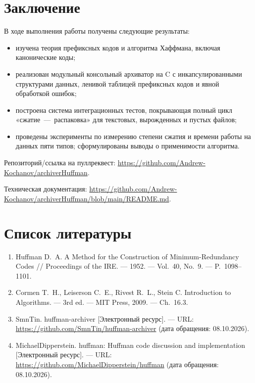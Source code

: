 \documentclass[a4paper]{article}
\begin{document}
\section{Заключение}

В ходе выполнения работы получены следующие результаты:

\begin{itemize}
    \item изучена теория префиксных кодов и алгоритма Хаффмана,
    включая канонические коды;
    \item реализован модульный консольный архиватор на C
    с инкапсулированными структурами данных, ленивой таблицей
    префиксных кодов и явной обработкой ошибок;
    \item построена система интеграционных тестов, покрывающая
    полный цикл «сжатие~---~распаковка» для текстовых,
    вырожденных и пустых файлов;
    \item проведены эксперименты по измерению степени сжатия
    и времени работы на данных пяти типов; сформулированы
    выводы о применимости алгоритма.
\end{itemize}

Репозиторий/ссылка на пуллреквест: \url{https://github.com/Andrew-Kochanov/archiverHuffman}.

Техническая документация: \url{https://github.com/Andrew-Kochanov/archiverHuffman/blob/main/README.md}.

\section*{Список литературы}

\begin{enumerate}
    \item Huffman D.~A. A Method for the Construction of Minimum-Redundancy
    Codes // Proceedings of the IRE. — 1952. — Vol.~40, No.~9. — P.~1098--1101.

    \item Cormen T.~H., Leiserson C.~E., Rivest R.~L., Stein C.
    Introduction to Algorithms. --- 3rd ed. --- MIT Press, 2009. --- Ch.~16.3.

    \item SmnTin. huffman-archiver [Электронный ресурс]. — URL:
    \url{https://github.com/SmnTin/huffman-archiver}
    (дата обращения: 08.10.2026).

    \item MichaelDipperstein. huffman: Huffman code discussion and
    implementation [Электронный ресурс]. — URL:
    \url{https://github.com/MichaelDipperstein/huffman}
    (дата обращения: 08.10.2026).
\end{enumerate}
\end{document}
